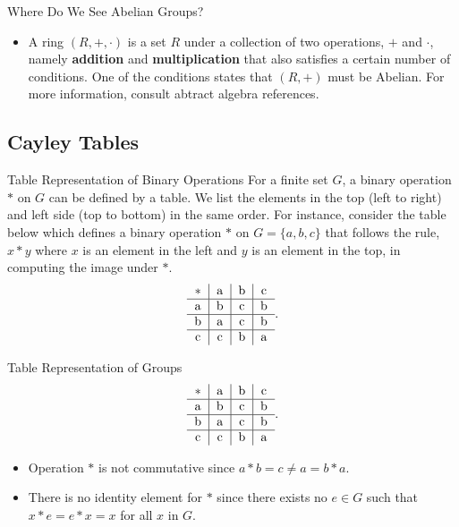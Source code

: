 \documentclass{beamer}
\begin{document}
\begin{frame}{Where Do We See Abelian Groups?}
\begin{itemize}
\justifying
\item A ring $(R,  +, \cdot)$ is a set $R$ under a collection of two operations, $+$ and $\cdot$, namely \textbf{addition} and \textbf{multiplication} that also satisfies a certain number of conditions. One of the conditions states that $(R, +)$ must be Abelian. For more information, consult abtract algebra references.
\end{itemize}
\end{frame}

\subsection{Cayley Tables}

\begin{frame}{Table Representation of Binary Operations}
\justifying
For a finite set $G$, a binary operation $*$ on $G$ can be defined by a table. We list the elements in the top (left to right) and left side (top to bottom) in the same order. For instance, consider the table below which defines a binary operation $*$ on $G = \{a, b, c\}$ that follows the rule, $x * y$ where $x$ is an element in the left and $y$ is an element in the top, in computing the image under $*$.  
\[
\begin{tabular}{ c | c | c | c}
$\ast$ & a & b & c \\
\hline
a & b & c & b \\ 
\hline
b & a & c & b \\ 
\hline
c & c & b & a
\end{tabular}.
\]
\end{frame}

\begin{frame}{Table Representation of Groups}
\justifying
\[
\begin{tabular}{ c | c | c | c}
$\ast$ & a & b & c \\
\hline
a & b & c & b \\ 
\hline
b & a & c & b \\ 
\hline
c & c & b & a
\end{tabular}.
\]
\begin{itemize}
\justifying
\item Operation $*$ is not commutative since $a * b = c \neq a = b * a$.
\pause
\item There is no identity element for $*$ since there exists no $e \in G$ such that $x * e = e * x = x$ for all $x$ in $G$.
\end{itemize}
\end{frame}
\end{document}
